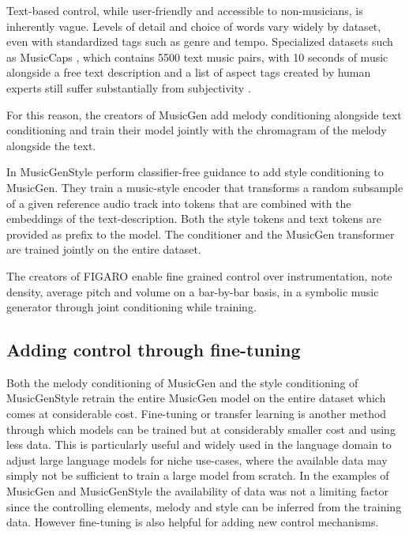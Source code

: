 Text-based control, while user-friendly and accessible to non-musicians, is inherently vague. Levels of detail and choice of words vary widely by dataset, even with standardized tags such as genre and tempo. Specialized datasets such as MusicCaps \cite{Agostinelli_Denk_Borsos_Engel_Verzetti_Caillon_Huang_Jansen_Roberts_Tagliasacchi_et_al._2023}, which contains 5500 text music pairs, with 10 seconds of music alongside a free text description and a list of aspect tags created by human experts still suffer substantially from subjectivity \cite{Lee_Doh_Jeong_2023_subjectivity_musiccaps}. 

For this reason, the creators of MusicGen \cite{copet2023simple} add melody conditioning alongside text conditioning and train their model jointly with the chromagram of the melody alongside the text.

In MusicGenStyle \cite{Rouard_Adi_Copet_Roebel_Défossez_musicgenstyle_2024} perform classifier-free guidance to add style conditioning to MusicGen. They train a music-style encoder that transforms a random subsample of a given reference audio track into tokens that are combined with the embeddings of the text-description. Both the style tokens and text tokens are provided as prefix to the model. The conditioner and the MusicGen transformer are trained jointly on the entire dataset. 

The creators of FIGARO\cite{Rütte_figaro_2023} enable fine grained control over instrumentation, note density, average pitch and volume on a bar-by-bar basis, in a symbolic music generator through joint conditioning while training. 

\subsection{Adding control through fine-tuning}

Both the melody conditioning of MusicGen \cite{copet2023simple} and the style conditioning of MusicGenStyle \cite{Rouard_Adi_Copet_Roebel_Défossez_musicgenstyle_2024} retrain the entire MusicGen model on the entire dataset which comes at considerable cost. Fine-tuning or transfer learning is another method through which models can be trained but at considerably smaller cost and using less data. This is particularly useful and widely used in the language domain to adjust large language models for niche use-cases, where the available data may simply not be sufficient to train a large model from scratch. In the examples of MusicGen and MusicGenStyle the availability of data was not a limiting factor since the controlling elements, melody and style can be inferred from the training data. However fine-tuning is also helpful for adding new control mechanisms.

